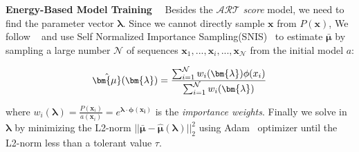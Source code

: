 \noindent\textbf{Energy-Based Model Training}
~~Besides the $\mathcal{ART}$ \textit{score} model, we need to find the parameter vector $\bm{\lambda}$. 
Since we cannot directly sample $\bm{x}$ from $P(\bm{x})$, We follow ~\citet{dpg} and use
Self Normalized Importance Sampling(SNIS)~\citep{DBLP:journals/corr/KimB16, mcbook,parshakova-etal-2019-global}
to estimate $\bar{\bm{\mu}}$ by sampling a large number $\mathcal{N}$ of sequences $\bm{x}_1, ..., \bm{x}_i, ..., \bm{x}_{\mathcal{N}}$ 
from the initial model $a$: 



\begin{equation}\label{apmu}
    \small
    \hat{\bm{\mu}}(\bm{\lambda}) = \frac{\sum_{i=1}^{\mathcal{N}}w_i({\bm{\lambda}})\phi(x_i)}{\sum_{i=1}^{\mathcal{N}}w_i(\bm{\lambda})}
\end{equation}

where $w_i(\bm{\lambda}) = \frac{P(\bm{x}_i)}{a(\bm{x}_i)} = e^{\bm{\lambda}\cdot \bm{\phi(\bm{x}_i)}}$ is the \textit{importance weights}.
Finally we solve in $\bm{\lambda}$ by minimizing the L2-norm $||\bar{\bm{\mu}} - \hat{\bm{\mu}}(\bm{\lambda})||_2^2$ using
Adam~\citep{adam} optimizer until the L2-norm less than a tolerant value $\tau$. 




